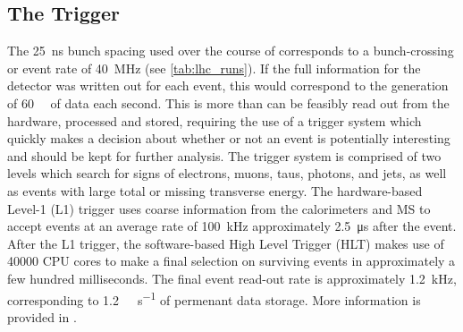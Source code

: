 \subsection{The Trigger}\label{sec:trigger}
The \SI{25}{\nano\second} bunch spacing used over the course of \runtwo corresponds to a bunch-crossing or event rate of \SI{40}{\mega\hertz} (see \cref{tab:lhc_runs}).
If the full information for the detector was written out for each event, this would correspond to the generation of \SI{60}{\tera\byte} of data each second.
This is more than can be feasibly read out from the hardware, processed and stored, requiring the use of a trigger system which quickly makes a decision about whether or not an event is potentially interesting and should be kept for further analysis.
The trigger system is comprised of two levels which search for signs of electrons, muons, taus, photons, and jets, as well as events with large total or missing transverse energy.
The hardware-based Level-1 (L1) trigger uses coarse information from the calorimeters and MS to accept events at an average rate of \SI{100}{\kilo\hertz} approximately \SI{2.5}{\micro\second} after the event.
After the L1 trigger, the software-based High Level Trigger (HLT) makes use of \num{40000} CPU cores to make a final selection on surviving events in approximately a few hundred milliseconds. 
The final event read-out rate is approximately \SI{1.2}{\kilo\hertz}, corresponding to \SI{1.2}{\giga\byte\per\second} of permenant data storage.
More information is provided in \cite{TRIG-2016-01}.


